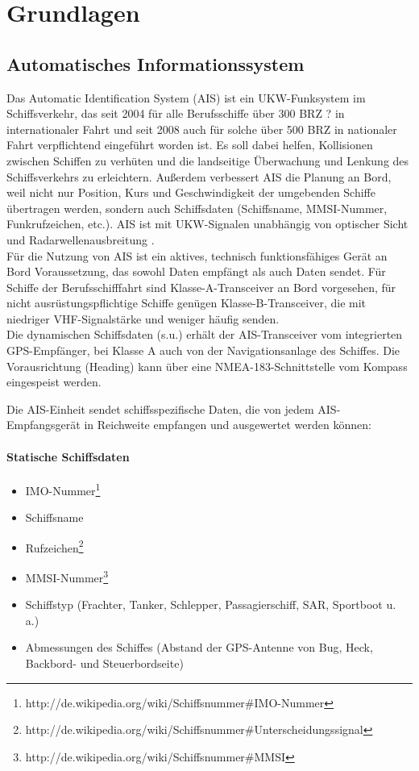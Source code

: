 \chapter{Grundlagen}\label{s.Grundlagen}
\section{Automatisches Informationssystem}\label{s.Automatisches Informationssystem (AIS)}
Das Automatic Identification System (AIS) ist ein UKW-Funksystem im Schiffsverkehr, das seit 2004 für alle Berufsschiffe über 300 BRZ ? in internationaler Fahrt und seit 2008 auch für solche über 500 BRZ in nationaler Fahrt verpflichtend eingeführt worden ist. Es soll dabei helfen, Kollisionen zwischen Schiffen zu verhüten und die landseitige Überwachung und Lenkung des Schiffsverkehrs zu erleichtern. Außerdem verbessert AIS die Planung an Bord, weil nicht nur Position, Kurs und Geschwindigkeit der umgebenden Schiffe übertragen werden, sondern auch Schiffsdaten (Schiffsname, MMSI-Nummer, Funkrufzeichen, etc.). AIS ist mit UKW-Signalen unabhängig von optischer Sicht und Radarwellenausbreitung \cite{wiki:ais}.\\
Für die Nutzung von AIS ist ein aktives, technisch funktionsfähiges Gerät an Bord Voraussetzung, das sowohl Daten empfängt als auch Daten sendet. Für Schiffe der Berufsschifffahrt sind Klasse-A-Transceiver an Bord vorgesehen, für nicht ausrüstungspflichtige Schiffe genügen Klasse-B-Transceiver, die mit niedriger VHF-Signalstärke und weniger häufig senden.  \\
Die dynamischen Schiffsdaten (s.u.) erhält der AIS-Transceiver vom integrierten GPS-Empfänger, bei Klasse A auch von der Navigationsanlage des Schiffes. Die Vorausrichtung (Heading) kann über eine NMEA-183-Schnittstelle vom Kompass eingespeist werden.

Die AIS-Einheit sendet schiffsspezifische Daten, die von jedem AIS-Empfangsgerät in Reichweite empfangen und ausgewertet werden können:
\subsubsection{Statische Schiffsdaten} \label{Statische Schiffsdaten}
\begin{itemize}
\item IMO-Nummer\footnote{http://de.wikipedia.org/wiki/Schiffsnummer\#IMO-Nummer}
\item Schiffsname
\item Rufzeichen\footnote{http://de.wikipedia.org/wiki/Schiffsnummer\#Unterscheidungssignal}
\item MMSI-Nummer\footnote{http://de.wikipedia.org/wiki/Schiffsnummer\#MMSI}
\item Schiffstyp (Frachter, Tanker, Schlepper, Passagierschiff, SAR, Sportboot u. a.)
\item Abmessungen des Schiffes (Abstand der GPS-Antenne von Bug, Heck, Backbord- und Steuerbordseite)
\end{itemize}

